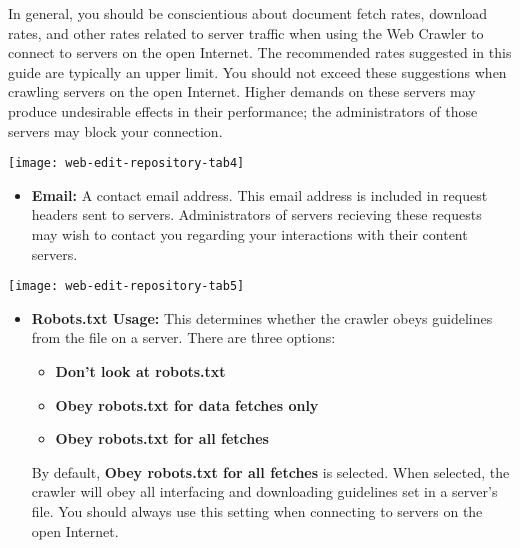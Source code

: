 In general, you should be conscientious about document fetch rates,
download rates, and other rates related to server traffic when using
the Web Crawler to connect to servers on the open Internet. The
recommended rates suggested in this guide are typically an upper
limit. You should not exceed these suggestions when crawling servers
on the open Internet. Higher demands on these servers may produce
undesirable effects in their performance; the administrators of those
servers may block your connection.


\texttt{[image: web-edit-repository-tab4]}

\begin{itemize}

\item \textbf{Email:} A contact email address. This email address is included in request headers sent to servers. Administrators of servers recieving these requests may wish to contact you regarding your interactions with their content servers.

\end{itemize}

\texttt{[image: web-edit-repository-tab5]}

\begin{itemize}

\item \textbf{Robots.txt Usage:} This determines whether the crawler obeys guidelines from the  file on a server. There are three options:

\begin{itemize}

\item \textbf{Don't look at robots.txt}

\item \textbf{Obey robots.txt for data fetches only}

\item \textbf{Obey robots.txt for all fetches}

\end{itemize}

By default, \textbf{Obey robots.txt for all fetches} is selected. When
selected, the crawler will obey all interfacing and downloading
guidelines set in a server's  file. You should
always use this setting when connecting to servers on the open
Internet.

\end{itemize}

